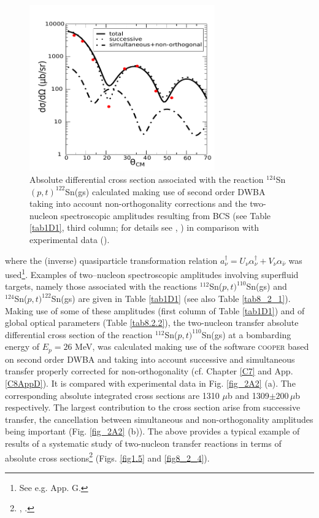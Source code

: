 \begin{figure}\label{fig2A3}
\centerline{\includegraphics*[width=8cm,angle=0]{nutshell/figs/fig2A3_v2}}
\caption{Absolute differential cross section associated with the reaction $^{124}$Sn$(p,t)^{122}$Sn(gs) calculated making use of second order DWBA taking into account non-orthogonality corrections and the two-nucleon spectroscopic amplitudes resulting from BCS (see Table \ref{tab1D1}, third column; for details see \cite{Potel:13}, \cite{Potel:13b}) in comparison with experimental data (\cite{Guazzoni:11}).}\label{fig_2A3}
\end{figure}
where the (inverse) quasiparticle transformation relation $a^{\dagger}_\nu=U_{\nu}\alpha^{\dagger}_{\nu}+V_{\nu}\alpha_{\bar{\nu}}$ was used\footnote{See e.g. \cite{Brink:05} App. G.}. Examples of  two--nucleon spectroscopic amplitudes involving superfluid targets, namely those associated with the reactions $^{112}$Sn($p,t)^{110}$Sn(gs) and\\ $^{124}$Sn($p,t)^{122}$Sn(gs) are given in Table \ref{tab1D1} (see also Table \ref{tab8_2_1}). Making use of some of these amplitudes (first column of Table \ref{tab1D1}) and of global optical parameters (Table \ref{tab8.2.2}), the two-nucleon transfer absolute differential cross section of the reaction $^{112}$Sn($p,t)^{110}$Sn(gs) at a bombarding energy of $E_p=26$ MeV, was calculated making use of the software \textsc{cooper} based on second order DWBA and taking into account successive and simultaneous transfer properly corrected for non-orthogonality (cf. Chapter \ref{C7} and App. \ref{C8AppD}). It is compared with experimental data in Fig. \ref{fig_2A2} (a). The corresponding absolute integrated cross sections are 1310 $\mu$b and 1309$\pm 200 \,\mu$b respectively. The largest contribution to the cross section  arise from successive transfer, the cancellation between simultaneous and non-orthogonality amplitudes being important (Fig. \ref{fig_2A2} (b)). The above provides a typical example of results of a systematic study of two-nucleon transfer reactions in terms of absolute cross sections\footnote{\cite{Potel:13}, \cite{Potel:13b}.} (Figs. \ref{fig1.5} and  \ref{fig8_2_4}).




